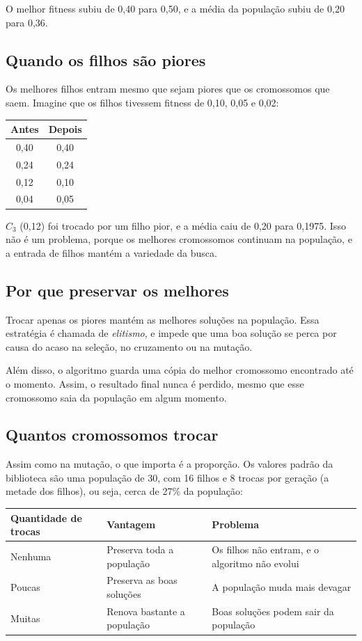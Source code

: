 \documentclass[11pt,a4paper]{article}
\newenvironment{tabela}{\par\nopagebreak[4]\vspace{0.3em}\nopagebreak[4]\begingroup\centering\small}{\par\endgroup\vspace{0.6em}}
\begin{document}
O melhor fitness subiu de 0,40 para 0,50, e a média da população subiu de 0,20 para 0,36.

\subsection{Quando os filhos são piores}

Os melhores filhos entram mesmo que sejam piores que os cromossomos que saem. Imagine que os filhos tivessem fitness de 0,10, 0,05 e 0,02:

\begin{tabela}
\begin{tabular}{cc}
\toprule
Antes & Depois\\
\midrule
0,40 & 0,40\\
0,24 & 0,24\\
0,12 & 0,10\\
0,04 & 0,05\\
\bottomrule
\end{tabular}
\end{tabela}

$C_3$ (0,12) foi trocado por um filho pior, e a média caiu de 0,20 para 0,1975. Isso não é um problema, porque os melhores cromossomos continuam na população, e a entrada de filhos mantém a variedade da busca.

\subsection{Por que preservar os melhores}

Trocar apenas os piores mantém as melhores soluções na população. Essa estratégia é chamada de \emph{elitismo}, e impede que uma boa solução se perca por causa do acaso na seleção, no cruzamento ou na mutação.

Além disso, o algoritmo guarda uma cópia do melhor cromossomo encontrado até o momento. Assim, o resultado final nunca é perdido, mesmo que esse cromossomo saia da população em algum momento.

\subsection{Quantos cromossomos trocar}

Assim como na mutação, o que importa é a proporção. Os valores padrão da biblioteca são uma população de 30, com 16 filhos e 8 trocas por geração (a metade dos filhos), ou seja, cerca de 27\% da população:

\begin{tabela}
\begin{tabularx}{\linewidth}{lLL}
\toprule
Quantidade de trocas & Vantagem & Problema\\
\midrule
Nenhuma & Preserva toda a população & Os filhos não entram, e o algoritmo não evolui\\
Poucas & Preserva as boas soluções & A população muda mais devagar\\
Muitas & Renova bastante a população & Boas soluções podem sair da população\\
\bottomrule
\end{tabularx}
\end{tabela}
\end{document}
